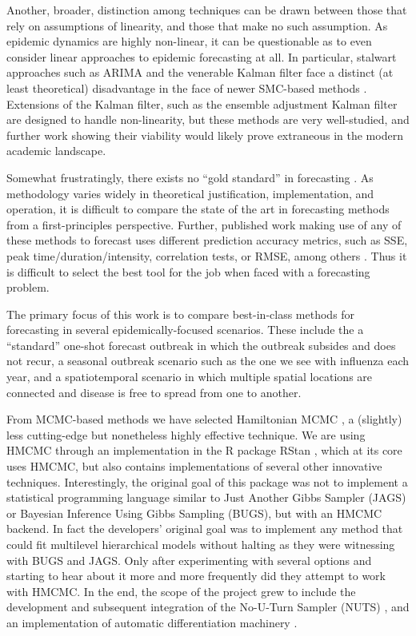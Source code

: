 Another, broader, distinction among techniques can be drawn between those that rely on assumptions of linearity, and those that make no such assumption. As epidemic dynamics are highly non-linear, it can be questionable as to even consider linear approaches to epidemic forecasting at all. In particular, stalwart approaches such as ARIMA and the venerable Kalman filter face a distinct (at least theoretical) disadvantage in the face of newer SMC-based methods \cite{Sugihara1994}\cite{Yang2014}. Extensions of the Kalman filter, such as the ensemble adjustment Kalman filter are designed to handle non-linearity, but these methods are very well-studied, and further work showing their viability would likely prove extraneous in the modern academic landscape.

Somewhat frustratingly, there exists no ``gold standard'' in forecasting \cite{Chretien2014}\cite{Nsoesie2014}\cite{Yang2014}. As methodology varies widely in theoretical justification, implementation, and operation, it is difficult to compare the state of the art in forecasting methods from a first-principles perspective. Further, published work making use of any of these methods to forecast uses different prediction accuracy metrics, such as SSE, peak time/duration/intensity, correlation tests, or RMSE, among others \cite{Chretien2014}\cite{Nsoesie2013}. Thus it is difficult to select the best tool for the job when faced with a forecasting problem.

The primary focus of this work is to compare best-in-class methods for forecasting in several epidemically-focused scenarios. These include the a ``standard'' one-shot forecast outbreak in which the outbreak subsides and does not recur, a seasonal outbreak scenario such as the one we see with influenza each year, and a spatiotemporal scenario in which multiple spatial locations are connected and disease is free to spread from one to another.

From MCMC-based methods we have selected Hamiltonian MCMC \cite{Neal2011}, a (slightly) less cutting-edge but nonetheless highly effective technique. We are using HMCMC through an implementation in the R package RStan \cite{Carpenter2016}, which at its core uses HMCMC, but also contains implementations of several other innovative techniques. Interestingly, the original goal of this package was not to implement a statistical programming language similar to Just Another Gibbs Sampler (JAGS) or Bayesian Inference Using Gibbs Sampling (BUGS), but with an HMCMC backend. In fact the developers' original goal was to implement any method that could fit multilevel hierarchical models without halting as they were witnessing with BUGS and JAGS. Only after experimenting with several options and starting to hear about it more and more frequently did they attempt to work with HMCMC. In the end, the scope of the project grew to include the development and subsequent integration of the No-U-Turn Sampler (NUTS) \cite{Hoffman2014}, and an implementation of automatic differentiation machinery \cite{StanDevelopmentTeam2015}.

